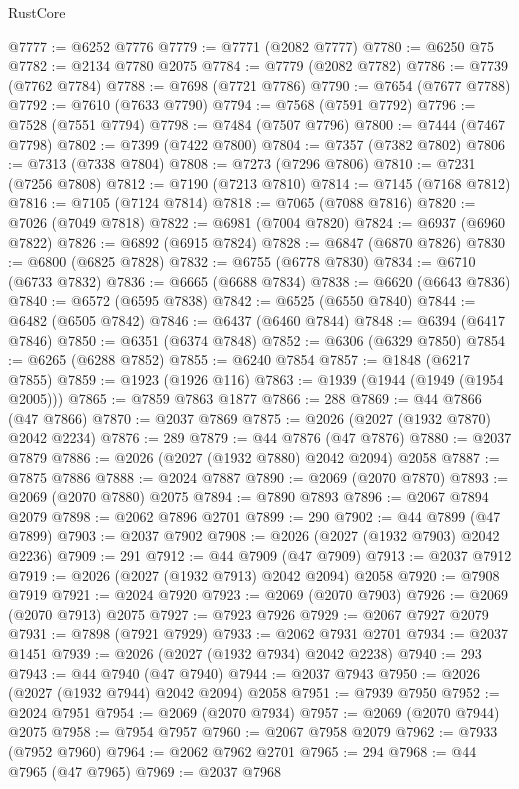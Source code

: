 \begin{lexlean}{RustCore}
\begin{coremodule}
@7777 := @6252 @7776
@7779 := @7771 (@2082 @7777)
@7780 := @6250 @75
@7782 := @2134 @7780 @2075
@7784 := @7779 (@2082 @7782)
@7786 := @7739 (@7762 @7784)
@7788 := @7698 (@7721 @7786)
@7790 := @7654 (@7677 @7788)
@7792 := @7610 (@7633 @7790)
@7794 := @7568 (@7591 @7792)
@7796 := @7528 (@7551 @7794)
@7798 := @7484 (@7507 @7796)
@7800 := @7444 (@7467 @7798)
@7802 := @7399 (@7422 @7800)
@7804 := @7357 (@7382 @7802)
@7806 := @7313 (@7338 @7804)
@7808 := @7273 (@7296 @7806)
@7810 := @7231 (@7256 @7808)
@7812 := @7190 (@7213 @7810)
@7814 := @7145 (@7168 @7812)
@7816 := @7105 (@7124 @7814)
@7818 := @7065 (@7088 @7816)
@7820 := @7026 (@7049 @7818)
@7822 := @6981 (@7004 @7820)
@7824 := @6937 (@6960 @7822)
@7826 := @6892 (@6915 @7824)
@7828 := @6847 (@6870 @7826)
@7830 := @6800 (@6825 @7828)
@7832 := @6755 (@6778 @7830)
@7834 := @6710 (@6733 @7832)
@7836 := @6665 (@6688 @7834)
@7838 := @6620 (@6643 @7836)
@7840 := @6572 (@6595 @7838)
@7842 := @6525 (@6550 @7840)
@7844 := @6482 (@6505 @7842)
@7846 := @6437 (@6460 @7844)
@7848 := @6394 (@6417 @7846)
@7850 := @6351 (@6374 @7848)
@7852 := @6306 (@6329 @7850)
@7854 := @6265 (@6288 @7852)
@7855 := @6240 @7854
@7857 := @1848 (@6217 @7855)
@7859 := @1923 (@1926 @116)
@7863 := @1939 (@1944 (@1949 (@1954 @2005)))
@7865 := @7859 @7863 @1877
@7866 := 288
@7869 := @44 @7866 (@47 @7866)
@7870 := @2037 @7869
@7875 := @2026 (@2027 (@1932 @7870) @2042 @2234)
@7876 := 289
@7879 := @44 @7876 (@47 @7876)
@7880 := @2037 @7879
@7886 := @2026 (@2027 (@1932 @7880) @2042 @2094) @2058
@7887 := @7875 @7886
@7888 := @2024 @7887
@7890 := @2069 (@2070 @7870)
@7893 := @2069 (@2070 @7880) @2075
@7894 := @7890 @7893
@7896 := @2067 @7894 @2079
@7898 := @2062 @7896 @2701
@7899 := 290
@7902 := @44 @7899 (@47 @7899)
@7903 := @2037 @7902
@7908 := @2026 (@2027 (@1932 @7903) @2042 @2236)
@7909 := 291
@7912 := @44 @7909 (@47 @7909)
@7913 := @2037 @7912
@7919 := @2026 (@2027 (@1932 @7913) @2042 @2094) @2058
@7920 := @7908 @7919
@7921 := @2024 @7920
@7923 := @2069 (@2070 @7903)
@7926 := @2069 (@2070 @7913) @2075
@7927 := @7923 @7926
@7929 := @2067 @7927 @2079
@7931 := @7898 (@7921 @7929)
@7933 := @2062 @7931 @2701
@7934 := @2037 @1451
@7939 := @2026 (@2027 (@1932 @7934) @2042 @2238)
@7940 := 293
@7943 := @44 @7940 (@47 @7940)
@7944 := @2037 @7943
@7950 := @2026 (@2027 (@1932 @7944) @2042 @2094) @2058
@7951 := @7939 @7950
@7952 := @2024 @7951
@7954 := @2069 (@2070 @7934)
@7957 := @2069 (@2070 @7944) @2075
@7958 := @7954 @7957
@7960 := @2067 @7958 @2079
@7962 := @7933 (@7952 @7960)
@7964 := @2062 @7962 @2701
@7965 := 294
@7968 := @44 @7965 (@47 @7965)
@7969 := @2037 @7968

\end{coremodule}
\end{lexlean}
